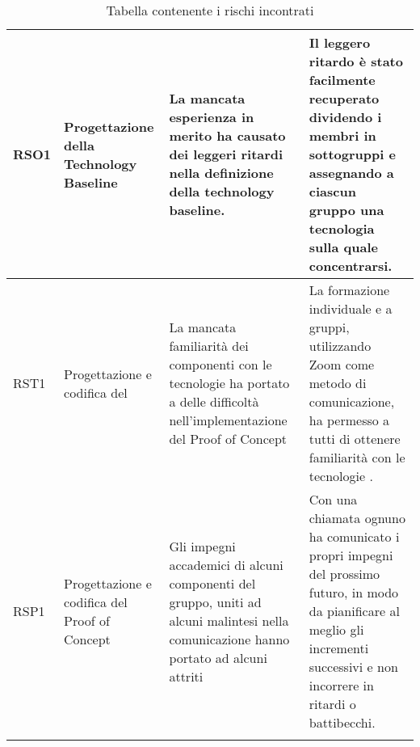 \begin{center}
\begin{longtable}{p{2cm}|p{3cm}|p{4cm}|p{4cm}|}
			\hline
			RSO1 & Progettazione della Technology Baseline & La mancata esperienza in merito ha causato dei leggeri ritardi nella definizione della technology baseline. & Il leggero ritardo è stato facilmente recuperato dividendo i membri in sottogruppi e assegnando a ciascun gruppo una tecnologia sulla quale concentrarsi.  \\
			\hline
			RST1 & Progettazione e codifica del \glock{Proof of Concept} & La mancata familiarità dei componenti con le tecnologie ha portato a delle difficoltà nell'implementazione del Proof of Concept & La formazione individuale e a gruppi, utilizzando Zoom come metodo di comunicazione, ha permesso a tutti di ottenere familiarità con le tecnologie . \\
			\hline
			RSP1 & Progettazione e codifica del Proof of Concept & Gli impegni accademici di alcuni componenti del gruppo, uniti ad alcuni malintesi nella comunicazione hanno portato ad alcuni attriti & Con una chiamata ognuno ha comunicato i propri impegni del prossimo futuro, in modo da pianificare al meglio gli incrementi successivi e non incorrere in ritardi o battibecchi. \\
			\rowcolor{white} 
			\caption{Tabella contenente i rischi incontrati}
	\end{longtable}
\end{center}
